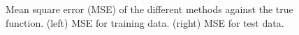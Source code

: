 \documentclass[]{interact}
\theoremstyle{plain}%
\theoremstyle{definition}
\theoremstyle{remark}
\begin{document}
\begin{figure}[H]
\centering
{}
\caption{Mean square error (MSE) of the different methods against the true function. (left) MSE for training data. (right) MSE for test data.}
  \label{fig13_MSE_train_BF_gaydata}
\end{figure}
\end{document}
